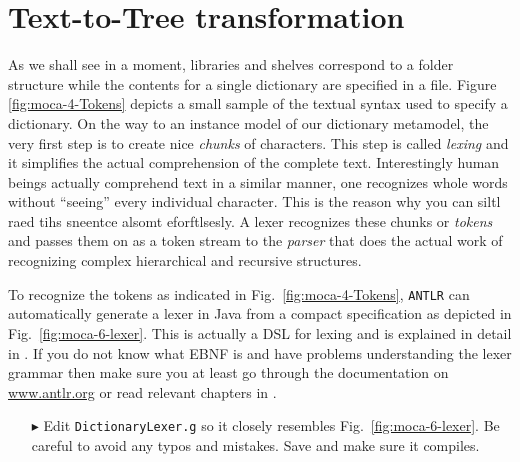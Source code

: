 \newpage
\section{Text-to-Tree transformation}
\genHeader

As we shall see in a moment, libraries and shelves correspond to a folder structure while the contents for a single dictionary are specified in a file.
Figure \ref{fig:moca-4-Tokens} depicts a small sample of the textual syntax used to specify a dictionary.
On the way to an instance model of our dictionary metamodel, the very first step is to create nice \emph{chunks} of characters.
This step is called \emph{lexing} and it simplifies the actual comprehension of the complete text.
Interestingly human beings actually comprehend text in a similar manner, one recognizes whole words without ``seeing'' every individual character.
This is the reason why you can siltl raed tihs sneentce alsomt eforftlsesly.   
A lexer recognizes these chunks or \emph{tokens} and passes them on as a token stream to the \emph{parser} that does the actual work of recognizing complex hierarchical and recursive structures.   
   
To recognize the tokens as indicated in Fig.~\ref{fig:moca-4-Tokens}, \texttt{ANTLR} can automatically generate a lexer in Java from a compact specification as depicted in Fig.~\ref{fig:moca-6-lexer}.
This is actually a DSL for lexing and is explained in detail in \cite{ANTLR}.
If you do not know what EBNF is and have problems understanding the lexer grammar then make sure you at least go through the documentation on \url{www.antlr.org} or read relevant chapters in \cite{ANTLR}.


\begin{enumerate}
\item[$\blacktriangleright$] Edit \texttt{DictionaryLexer.g} so it closely resembles Fig.~\ref{fig:moca-6-lexer}.
Be careful to avoid any typos and mistakes.  Save and make sure it compiles.  
\end{enumerate}



